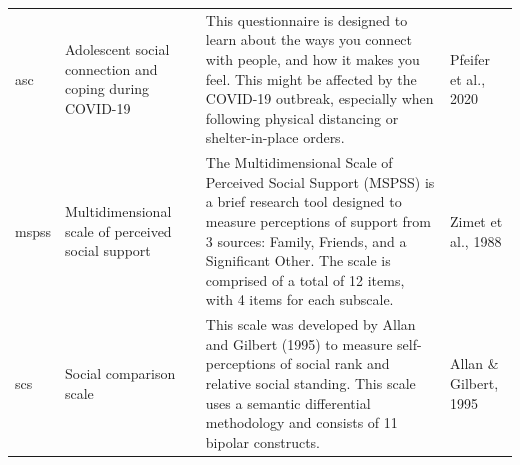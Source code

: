 \documentclass[]{book}
\begin{document}
\begin{longtable}[]{@{}llll@{}}
\begin{minipage}[t]{0.22\columnwidth}
asc\strut
\end{minipage} & \begin{minipage}[t]{0.27\columnwidth}\raggedright
Adolescent social connection and coping during COVID-19\strut
\end{minipage} & \begin{minipage}[t]{0.22\columnwidth}\raggedright
This questionnaire is designed to learn about the ways you connect with people, and how it makes you feel. This might be affected by the COVID-19 outbreak, especially when following physical distancing or shelter-in-place orders.\strut
\end{minipage} & \begin{minipage}[t]{0.18\columnwidth}\raggedright
Pfeifer et al., 2020\strut
\end{minipage}\tabularnewline
\begin{minipage}[t]{0.22\columnwidth}\raggedright
mspss\strut
\end{minipage} & \begin{minipage}[t]{0.27\columnwidth}\raggedright
Multidimensional scale of perceived social support\strut
\end{minipage} & \begin{minipage}[t]{0.22\columnwidth}\raggedright
The Multidimensional Scale of Perceived Social Support (MSPSS) is a brief research tool designed to measure perceptions of support from 3 sources: Family, Friends, and a Significant Other. The scale is comprised of a total of 12 items, with 4 items for each subscale.\strut
\end{minipage} & \begin{minipage}[t]{0.18\columnwidth}\raggedright
Zimet et al., 1988\strut
\end{minipage}\tabularnewline
\begin{minipage}[t]{0.22\columnwidth}\raggedright
scs\strut
\end{minipage} & \begin{minipage}[t]{0.27\columnwidth}\raggedright
Social comparison scale\strut
\end{minipage} & \begin{minipage}[t]{0.22\columnwidth}\raggedright
This scale was developed by Allan and Gilbert (1995) to measure self-perceptions of social rank and relative social standing. This scale uses a semantic differential methodology and consists of 11 bipolar constructs.\strut
\end{minipage} & \begin{minipage}[t]{0.18\columnwidth}\raggedright
Allan \& Gilbert, 1995\strut
\end{minipage}\tabularnewline
\bottomrule
\end{longtable}
\end{document}

